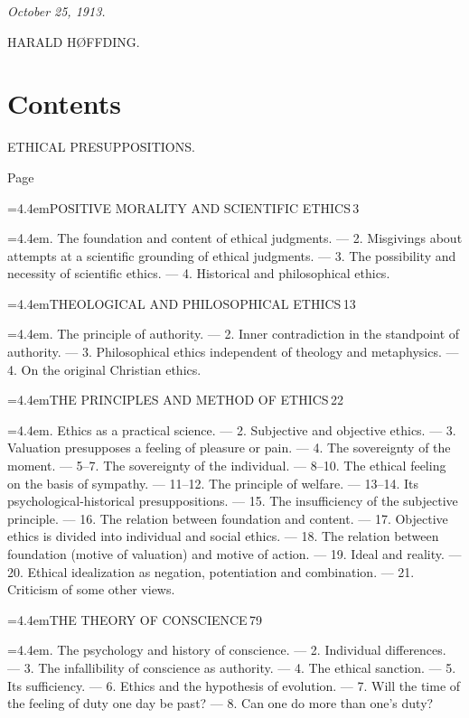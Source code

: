\documentclass[12pt,a4paper,openany]{book}
\newcommand{\ichap}[3]{\par\smallskip\noindent\hangindent=4.4em\hangafter=1\makebox[4.4em][l]{#1}#2\dotfill\,#3\par}
\newcommand{\idesc}[1]{\par{\small\leftskip=4.4em\noindent #1\par}}
\newcommand{\igroup}[1]{\par\bigskip\begin{center}\large #1\end{center}}
\begin{document}
\medskip
\noindent\hspace*{2em}\textit{October 25, 1913.}

\begin{flushright}HARALD HØFFDING.\hspace*{2em}\end{flushright}
\clearpage

\chapter*{Contents}
{\setlength{\parskip}{0pt}
%
\igroup{ETHICAL PRESUPPOSITIONS.}
\hfill{\scriptsize Page}\par
\ichap{I.}{POSITIVE MORALITY AND SCIENTIFIC ETHICS}{3}
\idesc{1. The foundation and content of ethical judgments. --- 2. Misgivings about attempts at a scientific grounding of ethical judgments. --- 3. The possibility and necessity of scientific ethics. --- 4. Historical and philosophical ethics.}
\ichap{II.}{THEOLOGICAL AND PHILOSOPHICAL ETHICS}{13}
\idesc{1. The principle of authority. --- 2. Inner contradiction in the standpoint of authority. --- 3. Philosophical ethics independent of theology and metaphysics. --- 4. On the original Christian ethics.}
\ichap{III.}{THE PRINCIPLES AND METHOD OF ETHICS}{22}
\idesc{1. Ethics as a practical science. --- 2. Subjective and objective ethics. --- 3. Valuation presupposes a feeling of pleasure or pain. --- 4. The sovereignty of the moment. --- 5--7. The sovereignty of the individual. --- 8--10. The ethical feeling on the basis of sympathy. --- 11--12. The principle of welfare. --- 13--14. Its psychological-historical presuppositions. --- 15. The insufficiency of the subjective principle. --- 16. The relation between foundation and content. --- 17. Objective ethics is divided into individual and social ethics. --- 18. The relation between foundation (motive of valuation) and motive of action. --- 19. Ideal and reality. --- 20. Ethical idealization as negation, potentiation and combination. --- 21. Criticism of some other views.}
\ichap{IV.}{THE THEORY OF CONSCIENCE}{79}
\idesc{1. The psychology and history of conscience. --- 2. Individual differences. --- 3. The infallibility of conscience as authority. --- 4. The ethical sanction. --- 5. Its sufficiency. --- 6. Ethics and the hypothesis of evolution. --- 7. Will the time of the feeling of duty one day be past? --- 8. Can one do more than one's duty?}
}
\end{document}
